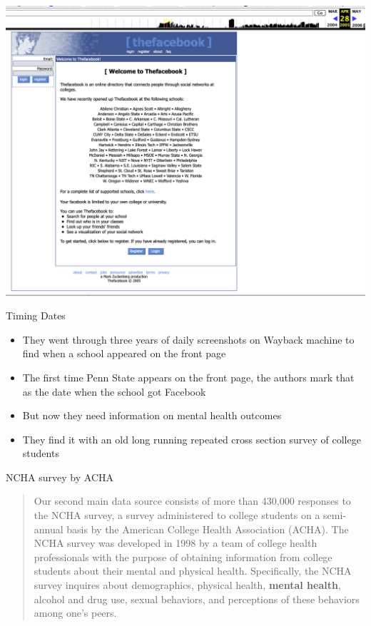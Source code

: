 \documentclass{beamer}
\begin{document}
\begin{frame}
\begin{center}
\includegraphics[scale=0.25]{./lecture_includes/wayback4}
\end{center}
\end{frame}

\begin{frame}{Timing Dates}

\begin{itemize}
\item They went through three years of daily screenshots on Wayback machine to find when a school appeared on the front page
\item The first time Penn State appears on the front page, the authors mark that as the date when the school got Facebook
\item But now they need information on mental health outcomes
\item They find it with an old long running repeated cross section survey of college students
\end{itemize}

\end{frame}

\begin{frame}{NCHA survey by ACHA}

\begin{quote}
Our second main data source consists of more than 430,000 responses to the NCHA survey, a survey administered to college students on a semi-annual basis by the American College Health Association (ACHA). The NCHA survey was developed in 1998 by a team of college health professionals with the purpose of obtaining information from college students about their mental and physical health. Specifically, the NCHA survey inquires about demographics, physical health, \textbf{mental health}, alcohol and drug use, sexual behaviors, and perceptions of these behaviors among one’s peers.
\end{quote}

\end{frame}
\end{document}

